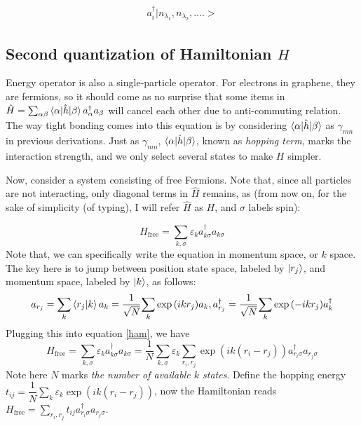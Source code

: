 \documentclass{article}
\begin{document}
\begin{eqnarray*}
a_i^{\dag} |   n_{\lambda_1}, n_{\lambda_2}, \ldots . >\end{eqnarray*}

\subsection{Second quantization of Hamiltonian $H$}
Energy operator is also a single-particle operator. For electrons in graphene, they are fermions, so it should come as no surprise that some items in $\hat{H} = \sum_{\alpha \beta} \braket{\alpha | \hat{h} | \beta} a_{\alpha}^{\dag}a_{\beta}$ will cancel each other due to anti-commuting relation. The way tight bonding comes into this equation is by considering $\braket{\alpha | \hat{h} | \beta}$ as $\gamma_{mn}$ in previous derivations. Just as $\gamma_{mn}$, $\braket{\alpha | \hat{h} | \beta}$, known as \textit{hopping term}, marks the interaction strength, and we only select several states to make $H$ simpler.


Now, consider a system consisting of free Fermions. Note that, since all particles are not interacting, only diagonal terms in $\hat{H}$ remains, as (from now on, for the sake of simplicity (of typing), I will refer $\hat{H}$ as $H$, and $\sigma$ labels spin):

\begin{equation}
    H_{\text{free}} = \underset{k, \sigma}{\sum} \varepsilon_k a_{k\sigma}^{\dag} a_{k \sigma}
    \label{ham}
\end{equation}
Note that, we can specifically write the equation in momentum space, or $k$ space. The key here is to jump between position state space, labeled by $\ket{r_j}$, and momentum space, labeled by $\ket{k}$, as follows:
\begin{equation}
    a_{r_j} = \underset{k}{\sum}\braket{r_j|k}a_k=\dfrac{1}{\sqrt{N}}\underset{k}{\sum}\exp{(ikr_j)}a_k, a^{\dag}_{r_j}  = \dfrac{1}{\sqrt{N}}\underset{k}{\sum}\exp{(-ikr_j)}a^{\dag}_k
\end{equation}
Plugging this into equation \ref{ham}, we have
\begin{equation}
    H_{\text{free}} = 
    \underset{k, \sigma}{\sum} 
    \varepsilon_k a_{k\sigma}^{\dag} a_{k \sigma}
    =\dfrac{1}{N} \underset{k, \sigma}{\sum} 
    \varepsilon_k \underset{r_i,r_j}{\sum}\exp{(ik(r_i-r_j))} a^{\dag}_{r_i\sigma}a_{r_j\sigma}
    \label{raw_tb}
\end{equation}
Note here $N$ marks \textit{the number of available $k$ states}. Define the hopping energy $t_{ij} = \dfrac{1}{N} \underset{k}{\sum}\varepsilon_k\exp{(ik(r_i-r_j))}$, now the Hamiltonian reads $H_{\text{free}} = \underset{r_i,r_j}{\sum} t_{ij}a^{\dag}_{r_i\sigma} a_{r_j\sigma}$. 
\end{document}
